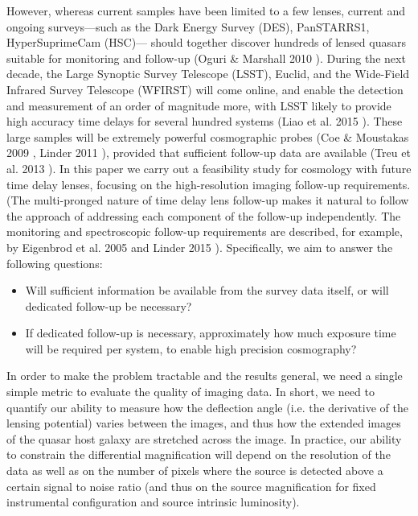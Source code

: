 \documentclass[a4paper,11pt]{article}
\begin{document}
However, whereas current samples have been limited to a few lenses,
current and ongoing surveys---such as the Dark Energy Survey (DES),
PanSTARRS1, HyperSuprimeCam (HSC)--- should together discover hundreds
of lensed quasars suitable for monitoring and follow-up (Oguri \&
Marshall 2010 \cite{2010MNRAS.405.2579O}). During the next decade, the
Large Synoptic Survey Telescope (LSST), Euclid, and the Wide-Field
Infrared Survey Telescope (WFIRST) will come online, and enable the
detection and measurement of an order of magnitude more, with LSST
likely to provide high accuracy time delays for several hundred
systems (Liao et al. 2015 \cite{2015ApJ...800...11L}). These large
samples will be extremely powerful cosmographic probes (Coe \&
Moustakas 2009 \citep{2009ApJ...706...45C}, Linder 2011
\citep{2011PhRvD..84l3529L}), provided that sufficient follow-up data
are available (Treu et al. 2013 \citep{2013arXiv1306.1272T}). In this
paper we carry out a feasibility study for cosmology with future time
delay lenses, focusing on the  high-resolution imaging follow-up
requirements. (The multi-pronged nature of time delay lens follow-up
makes it natural to follow the approach of addressing each component
of the follow-up independently. The monitoring and spectroscopic
follow-up requirements are described, for example, by Eigenbrod et al.
2005 \cite{2005A&A...436...25E} and Linder 2015
\cite{2015PhRvD..91h3511L}). Specifically, we aim to answer the
following questions:
\begin{itemize}
    \item Will sufficient information be available from the survey
            data itself, or will dedicated follow-up be necessary?
    \item If dedicated follow-up is necessary, approximately how much
            exposure time will be required per system, to enable
            high precision cosmography?
\end{itemize}

In order to make the problem tractable and the results general, we
need a single simple metric to evaluate the quality of imaging data.
In short, we need to quantify our ability to measure how the
deflection angle (i.e. the derivative of the lensing potential) varies
between the images, and thus how the extended images of the quasar
host galaxy are stretched across the image. In practice, our ability
to constrain the differential magnification will depend on the
resolution of the data as well as on the number of pixels where the
source is detected above a certain signal to noise ratio (and thus on
the source magnification for fixed instrumental configuration and
source intrinsic luminosity).
\end{document}
